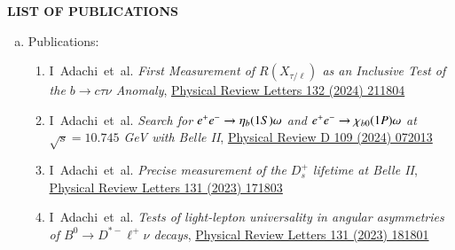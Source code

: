 \documentclass[12pt]{article}
\begin{document}
\pagebreak
\vspace{0.4cm}
\colorbox{gray!40}{\begin{minipage}{16.2cm}
    \bf {LIST OF PUBLICATIONS} 
\end{minipage} }
\begin{justify}
\begin{enumerate}[a.]
\item Publications:
  \begin{enumerate}[1.]
    \item I~Adachi~et~al. \emph{First Measurement of $R(X_{\tau/\ell})$ as an Inclusive Test of the $\ensuremath{b \to c \tau \nu}$ Anomaly}, \href{https://doi.org/10.1103/PhysRevLett.132.211804}{Physical Review Letters 132 (2024) 211804}
  \item I~Adachi~et~al. \emph{Search for $e^+ e^{\mathstrut -} \to \eta_b(1S)\omega$ and $e^+ e^{\mathstrut -} \to \chi_{b0}(1P)\omega$ at $\sqrt{s} = 10.745$ GeV with Belle II}, \href{https://doi.org/10.1103/PhysRevD.109.072013}{Physical Review D 109 (2024) 072013}
  \item I~Adachi~et~al. \emph{Precise measurement of the $D_s^+$ lifetime at Belle II}, \href{https://doi.org/10.1103/PhysRevLett.131.171803}{Physical Review Letters 131 (2023) 171803}
    \item I~Adachi~et~al. \emph{Tests of light-lepton universality in angular asymmetries of $B^0 \to D^{*-} \ell^+ \nu$ decays}, \href{https://doi.org/10.1103/PhysRevLett.131.181801}{Physical Review Letters 131 (2023) 181801}

\end{enumerate}
\end{enumerate}
\end{justify}
\end{document}
